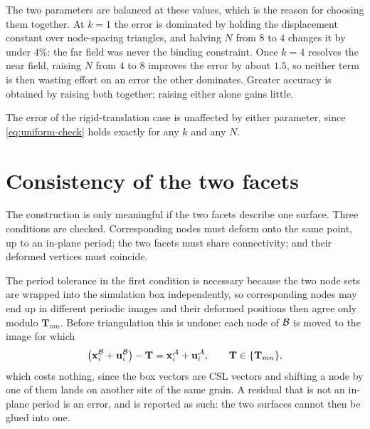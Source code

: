 The two parameters are balanced at these values, which is the reason for
choosing them together. At $k=1$ the error is dominated by holding the
displacement constant over node-spacing triangles, and halving $N$ from $8$ to
$4$ changes it by under $4\%$: the far field was never the binding constraint.
Once $k=4$ resolves the near field, raising $N$ from $4$ to $8$ improves the
error by about $1.5$, so neither term is then wasting effort on an error the
other dominates. Greater accuracy is obtained by raising both together; raising
either alone gains little.

The error of the rigid-translation case is unaffected by either parameter, since
\eqref{eq:uniform-check} holds exactly for any $k$ and any $N$.

\section*{Consistency of the two facets}

The construction is only meaningful if the two facets describe one surface.
Three conditions are checked. Corresponding nodes must deform onto the same
point, up to an in-plane period; the two facets must share connectivity; and
their deformed vertices must coincide.

The period tolerance in the first condition is necessary because the two node
sets are wrapped into the simulation box independently, so corresponding nodes
may end up in different periodic images and their deformed positions then agree
only modulo $\mathbf{T}_{mn}$. Before triangulation this is undone: each node of
$\mathcal{B}$ is moved to the image for which
\begin{equation}
  \bigl(\mathbf{x}^{\mathcal{B}}_i + \mathbf{u}^{\mathcal{B}}_i\bigr) - \mathbf{T}
  = \mathbf{x}^{\mathcal{A}}_i + \mathbf{u}^{\mathcal{A}}_i ,
  \qquad
  \mathbf{T} \in \{\mathbf{T}_{mn}\} ,
  \label{eq:glue}
\end{equation}
which costs nothing, since the box vectors are CSL vectors and shifting a node
by one of them lands on another site of the same grain. A residual that is not
an in-plane period is an error, and is reported as such: the two surfaces cannot
then be glued into one.


